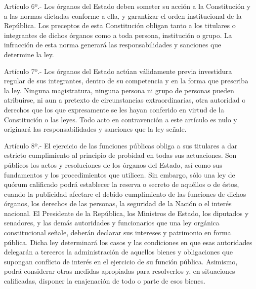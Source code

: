     Artículo 6º.- Los órganos del Estado deben someter su acción a la Constitución y a las normas dictadas conforme a ella, y garantizar el orden institucional de la República.
    Los preceptos de esta Constitución obligan tanto a los titulares o integrantes de dichos órganos como a toda persona, institución o grupo.
    La infracción de esta norma generará las responsabilidades y sanciones que determine la ley.


    Artículo 7º.- Los órganos del Estado actúan válidamente previa investidura regular de sus integrantes, dentro de su competencia y en la forma que prescriba la ley.
    Ninguna magistratura, ninguna persona ni grupo de personas pueden atribuirse, ni aun a pretexto de circunstancias extraordinarias, otra autoridad o derechos que los que expresamente se les hayan conferido en virtud de la Constitución o las leyes.
    Todo acto en contravención a este artículo es nulo y originará las responsabilidades y sanciones que la ley señale.



    Artículo 8º.- El ejercicio de las funciones públicas obliga a sus titulares a dar estricto cumplimiento al principio de probidad en todas sus actuaciones.
    Son públicos los actos y resoluciones de los órganos del Estado, así como sus fundamentos y los procedimientos que utilicen. Sin embargo, sólo una ley de quórum calificado podrá establecer la reserva o secreto de aquéllos o de éstos, cuando la publicidad afectare el debido cumplimiento de las funciones de dichos órganos, los derechos de las personas, la seguridad de la Nación o el interés nacional.
    El Presidente de la República, los Ministros de Estado, los diputados y senadores, y las demás autoridades y funcionarios que una ley orgánica constitucional señale, deberán declarar sus intereses y patrimonio en forma pública.
    Dicha ley determinará los casos y las condiciones en que esas autoridades delegarán a terceros la administración de aquellos bienes y obligaciones que supongan conflicto de interés en el ejercicio de su función pública. Asimismo, podrá considerar otras medidas apropiadas para resolverlos y, en situaciones calificadas, disponer la enajenación de todo o parte de esos bienes.


